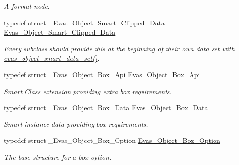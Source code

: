 \begin{DoxyCompactItemize}
\begin{DoxyCompactList}\small\item\em A format node. \item\end{DoxyCompactList}\item 
typedef struct \_\-Evas\_\-Object\_\-Smart\_\-Clipped\_\-Data \hyperlink{Evas_8h_a65c1b2ed3578175e476998f7b55dfe34}{Evas\_\-Object\_\-Smart\_\-Clipped\_\-Data}\label{Evas_8h_a65c1b2ed3578175e476998f7b55dfe34}

\begin{DoxyCompactList}\small\item\em Every subclass should provide this at the beginning of their own data set with \hyperlink{group__Evas__Smart__Object__Group_gae40928b2993cc169e606820ae21dbb6e}{evas\_\-object\_\-smart\_\-data\_\-set()}. \item\end{DoxyCompactList}\item 
typedef struct \hyperlink{struct__Evas__Object__Box__Api}{\_\-Evas\_\-Object\_\-Box\_\-Api} \hyperlink{group__Evas__Object__Box_ga2a8fbeeab4f5ae23e7bc1b291e27c5e1}{Evas\_\-Object\_\-Box\_\-Api}\label{group__Evas__Object__Box_ga2a8fbeeab4f5ae23e7bc1b291e27c5e1}

\begin{DoxyCompactList}\small\item\em Smart Class extension providing extra box requirements. \item\end{DoxyCompactList}\item 
typedef struct \hyperlink{struct__Evas__Object__Box__Data}{\_\-Evas\_\-Object\_\-Box\_\-Data} \hyperlink{group__Evas__Object__Box_gac9047b7cff95df59f61c7321967caf7b}{Evas\_\-Object\_\-Box\_\-Data}\label{group__Evas__Object__Box_gac9047b7cff95df59f61c7321967caf7b}

\begin{DoxyCompactList}\small\item\em Smart instance data providing box requirements. \item\end{DoxyCompactList}\item 
typedef struct \_\-Evas\_\-Object\_\-Box\_\-Option \hyperlink{group__Evas__Object__Box_gabbeb05bf47aaf7681e9d83a1b0055d20}{Evas\_\-Object\_\-Box\_\-Option}\label{group__Evas__Object__Box_gabbeb05bf47aaf7681e9d83a1b0055d20}

\begin{DoxyCompactList}\small\item\em The base structure for a box option. \item\end{DoxyCompactList}\end{DoxyCompactItemize}
